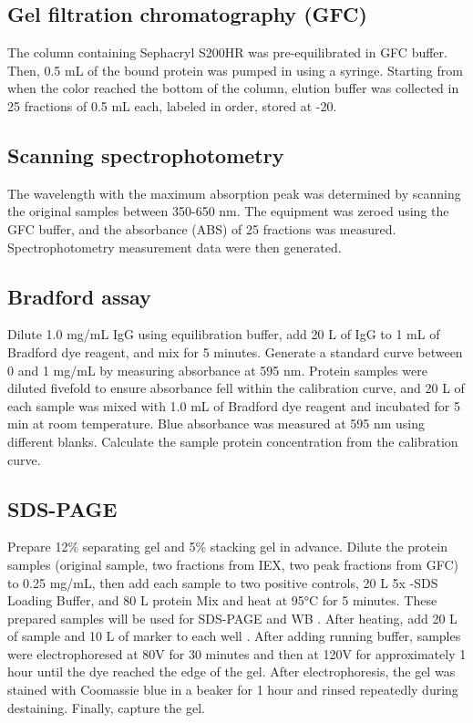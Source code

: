 \documentclass[a4paper,10pt]{article}
\begin{document}
\begin{multicols}{2}
\subsection{Gel filtration chromatography (GFC)}
The column containing Sephacryl S200HR was pre-equilibrated in GFC buffer. Then, 0.5 mL of the bound protein was pumped in using a syringe. Starting from when the color reached the bottom of the column, elution buffer was collected in 25 fractions of 0.5 mL each, labeled in order,  stored at -20\textcelsius.


\subsection{Scanning spectrophotometry}

The wavelength with the maximum absorption peak was determined by scanning the original samples between 350-650 nm. The equipment was zeroed using the GFC buffer, and the absorbance (ABS) of 25 fractions was measured. Spectrophotometry measurement data were then generated.


\subsection{Bradford assay}
Dilute 1.0 mg/mL IgG using equilibration buffer, add 20 \textmu L of IgG to 1 mL of Bradford dye reagent, and mix for 5 minutes. Generate a standard curve between 0 and 1 mg/mL by measuring absorbance at 595 nm. Protein samples were diluted fivefold to ensure absorbance fell within the calibration curve, and 20 \textmu L of each sample was mixed with 1.0 mL of Bradford dye reagent and incubated for 5 min at room temperature. Blue absorbance was measured at 595 nm using different blanks. Calculate the sample protein concentration from the calibration curve.


\subsection{SDS-PAGE}
Prepare 12\% separating gel and 5\% stacking gel in advance. Dilute the protein samples (original sample, two fractions from IEX, two peak fractions from GFC) to 0.25 mg/mL, then add each sample to two positive controls, 20 \textmu L 5x -SDS Loading Buffer, and 80 \textmu L protein Mix and heat at 95°C for 5 minutes. These prepared samples will be used for SDS-PAGE and WB . After heating, add 20 \textmu L of sample and 10 \textmu L of marker to each well . After adding running buffer, samples were electrophoresed at 80V for 30 minutes and then at 120V for approximately 1 hour until the dye reached the edge of the gel. After electrophoresis, the gel was stained with Coomassie blue in a beaker for 1 hour and rinsed repeatedly during destaining. Finally, capture the gel.



\end{multicols}
\end{document}
